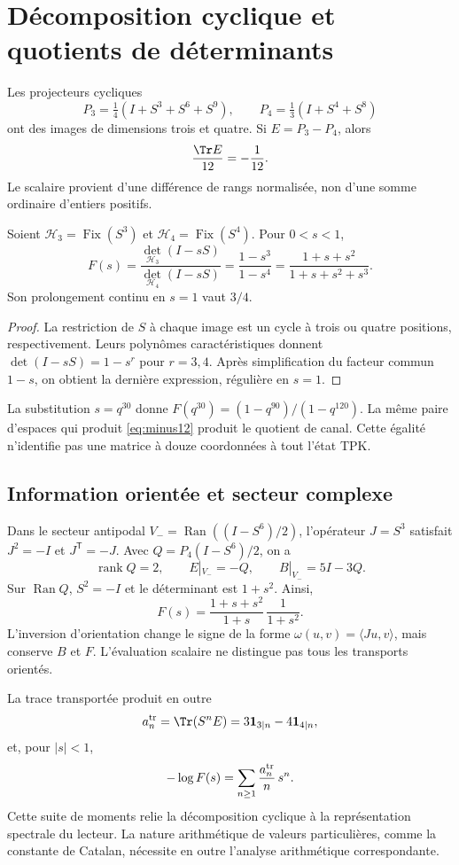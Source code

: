 \section{Décomposition cyclique et quotients de déterminants}
Les projecteurs cycliques
\[
P_3=\tfrac14(I+S^3+S^6+S^9),\qquad
P_4=\tfrac13(I+S^4+S^8)
\]
ont des images de dimensions trois et quatre. Si $E=P_3-P_4$, alors
\begin{equation}
\frac{\Tr E}{12}=-\frac1{12}.
\label{eq:minus12}
\end{equation}
Le scalaire provient d'une différence de rangs normalisée, non d'une
somme ordinaire d'entiers positifs.

\begin{theorem}
Soient $\mathcal H_3=\operatorname{Fix}(S^3)$ et
$\mathcal H_4=\operatorname{Fix}(S^4)$. Pour $0<s<1$,
\begin{equation}
F(s)=\frac{\det_{\mathcal H_3}(I-sS)}{\det_{\mathcal H_4}(I-sS)}
=\frac{1-s^3}{1-s^4}
=\frac{1+s+s^2}{1+s+s^2+s^3}.
\label{eq:det}
\end{equation}
Son prolongement continu en $s=1$ vaut $3/4$.
\end{theorem}
\begin{proof}
La restriction de $S$ à chaque image est un cycle à trois ou quatre
positions, respectivement. Leurs polynômes caractéristiques donnent
$\det(I-sS)=1-s^r$ pour $r=3,4$. Après simplification du facteur commun $1-s$,
on obtient la dernière expression, régulière en $s=1$.
\end{proof}

La substitution $s=q^{30}$ donne
$F(q^{30})=(1-q^{90})/(1-q^{120})$.
La même paire d’espaces qui produit \eqref{eq:minus12}
produit le quotient de canal. Cette égalité n’identifie pas
une matrice à douze coordonnées à tout l’état TPK.

\subsection{Information orientée et secteur complexe}
Dans le secteur antipodal $V_-=\operatorname{Ran}((I-S^6)/2)$,
l'opérateur $J=S^3$ satisfait $J^2=-I$ et $J^{\mathsf T}=-J$.
Avec $Q=P_4(I-S^6)/2$, on a
\[
\operatorname{rank}Q=2,\qquad E|_{V_-}=-Q,\qquad B|_{V_-}=5I-3Q.
\]
Sur $\operatorname{Ran}Q$, $S^2=-I$ et le déterminant est $1+s^2$.
Ainsi,
\[
F(s)=\frac{1+s+s^2}{1+s}\,\frac1{1+s^2}.
\]
L'inversion d'orientation change le signe de la forme
$\omega(u,v)=\langle Ju,v\rangle$, mais conserve $B$ et $F$.
L'évaluation scalaire ne distingue pas tous les transports orientés.

La trace transportée produit en outre
\[
a_n^{\rm tr}=\Tr(S^nE)=3\mathbf1_{3\mid n}-4\mathbf1_{4\mid n},
\]
et, pour $|s|<1$,
\[
-\log F(s)=\sum_{n\ge1}\frac{a_n^{\rm tr}}n\,s^n.
\]
Cette suite de moments relie la décomposition cyclique à la
représentation spectrale du lecteur. La nature arithmétique de valeurs
particulières, comme la constante de Catalan, nécessite en outre l’analyse
arithmétique correspondante.
